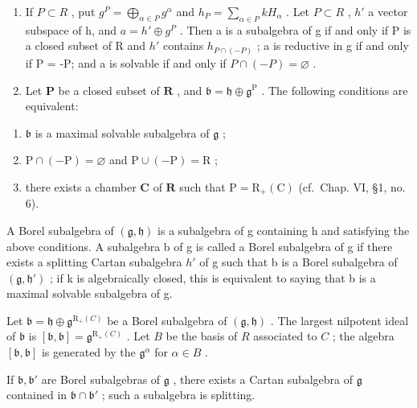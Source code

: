 \begin{enumerate}
\def\labelenumi{\arabic{enumi})}
\setcounter{enumi}{12}
\item
  If \(P \subset R\) , put \(g^{P} = \bigoplus_{\alpha \in P} g^{\alpha}\) and \(h_{P} = \sum_{\alpha \in P} kH_{\alpha}\) . Let \(P \subset R\) , \(h'\) a vector subspace of h, and \(a = h' \oplus g^{P}\) . Then a is a subalgebra of g if and only if P is a closed subset of R and \(h'\) contains \(h_{P \cap (-P)}\) ; a is reductive in g if and only if P = -P; and a is solvable if and only if \(P \cap (-P) = \varnothing\) .
\item
  Let \(\mathbf{P}\) be a closed subset of \(\mathbf{R}\) , and \(\mathfrak{b} = \mathfrak{h} \oplus \mathfrak{g}^{\mathrm{P}}\) . The following conditions are equivalent:
\end{enumerate}

\begin{enumerate}
\def\labelenumi{(\roman{enumi})}
\item
  \(\mathfrak{b}\) is a maximal solvable subalgebra of \(\mathfrak{g}\) ;
\item
  \(\mathrm{P} \cap (-\mathrm{P}) = \varnothing\) and \(\mathrm{P} \cup (-\mathrm{P}) = \mathrm{R}\) ;
\item
  there exists a chamber \(\mathbf{C}\) of \(\mathbf{R}\) such that \(\mathrm{P} = \mathrm{R}_{+}(\mathrm{C})\) (cf.~Chap. VI, §1, no. 6).
\end{enumerate}

A Borel subalgebra of \((\mathfrak{g},\mathfrak{h})\) is a subalgebra of g containing h and satisfying the above conditions. A subalgebra b of g is called a Borel subalgebra of g if there exists a splitting Cartan subalgebra \(h'\) of g such that b is a Borel subalgebra of \((\mathfrak{g},\mathfrak{h}')\) ; if k is algebraically closed, this is equivalent to saying that b is a maximal solvable subalgebra of g.

Let \(\mathfrak{b} = \mathfrak{h} \oplus \mathfrak{g}^{\mathrm{R}_{+}(C)}\) be a Borel subalgebra of \((\mathfrak{g}, \mathfrak{h})\) . The largest nilpotent ideal of \(\mathfrak{b}\) is \([\mathfrak{b}, \mathfrak{b}] = \mathfrak{g}^{\mathrm{R}_{+}(C)}\) . Let \(B\) be the basis of \(R\) associated to \(C\) ; the algebra \([\mathfrak{b}, \mathfrak{b}]\) is generated by the \(\mathfrak{g}^{\alpha}\) for \(\alpha \in B\) .

If \(\mathfrak{b},\mathfrak{b}'\) are Borel subalgebras of \(\mathfrak{g}\) , there exists a Cartan subalgebra of \(\mathfrak{g}\) contained in \(\mathfrak{b} \cap \mathfrak{b}'\) ; such a subalgebra is splitting.

